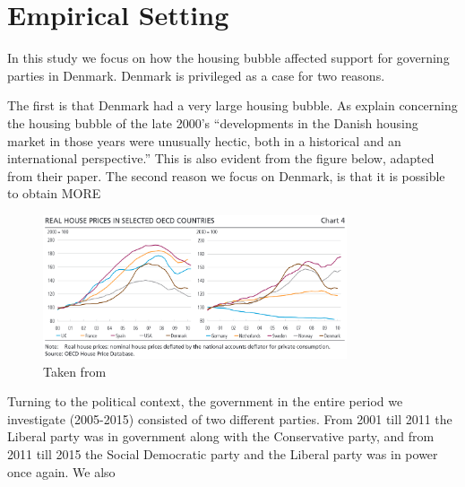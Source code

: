 \documentclass[12pt,a4paper]{article}
\begin{document}
\section{Empirical Setting}

In this study we focus on how the housing bubble affected support for governing parties in Denmark. Denmark is privileged as a case for two reasons.

The first is that Denmark had a very large housing bubble. As \cite[][49]{dam2011housing} explain concerning the housing bubble of the late 2000's ``developments in the Danish housing market in those years were unusually hectic, both in a historical and an international perspective.'' This is also evident from the figure below, adapted from their paper. The second reason we focus on Denmark, is that it is possible to obtain MORE



\begin{figure}
	\includegraphics[width=0.8\textwidth]{../figures/intcomparison}
	\centering
	\caption{Taken from \citep[50]{dam2011housing}}
\end{figure}



Turning to the political context, the government in the entire period we investigate (2005-2015) consisted of two different parties. From 2001 till 2011 the Liberal party was in government along with the Conservative party, and from 2011 till 2015 the Social Democratic party and the Liberal party was in power once again. We also
\end{document}
